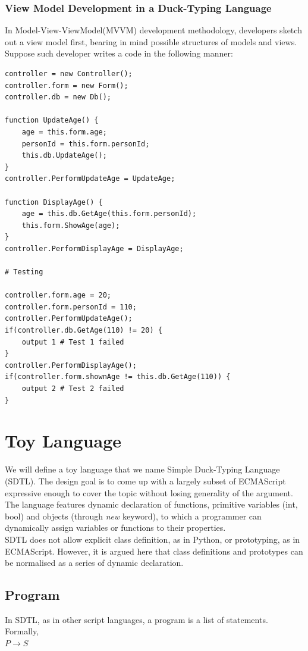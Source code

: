 \documentclass[a4paper,12pt]{article}
\begin{document}
\subsubsection{View Model Development in a Duck-Typing Language}
In Model-View-ViewModel(MVVM) development methodology, developers sketch out a view model first, bearing in mind possible structures of models and views. Suppose such developer writes a code in the following manner:\\
\begin{lstlisting}[caption=Controller written in a Duck-Typing language]
controller = new Controller();
controller.form = new Form();
controller.db = new Db();

function UpdateAge() {
	age = this.form.age;
	personId = this.form.personId;
	this.db.UpdateAge();
}
controller.PerformUpdateAge = UpdateAge;

function DisplayAge() {
	age = this.db.GetAge(this.form.personId);
	this.form.ShowAge(age);
}
controller.PerformDisplayAge = DisplayAge;

# Testing

controller.form.age = 20;
controller.form.personId = 110;
controller.PerformUpdateAge();
if(controller.db.GetAge(110) != 20) {
	output 1 # Test 1 failed
}
controller.PerformDisplayAge();
if(controller.form.shownAge != this.db.GetAge(110)) {
	output 2 # Test 2 failed
}
\end{lstlisting}

\section{Toy Language}
We will define a toy language that we name Simple Duck-Typing Language (SDTL). The design goal is to come up with a largely subset of ECMAScript expressive enough to cover the topic without losing generality of the argument. The language features dynamic declaration of functions, primitive variables (int, bool) and objects (through \textit{new} keyword), to which a programmer can dynamically assign variables or functions to their properties.\\
SDTL does not allow explicit class definition, as in Python, or prototyping, as in ECMAScript. However, it is argued here that class definitions and prototypes can be normalised as a series of dynamic declaration.\\

\subsection{Program}
In SDTL, as in other script languages, a program is a list of statements. Formally,\\
$P \rightarrow S$\\
\end{document}
